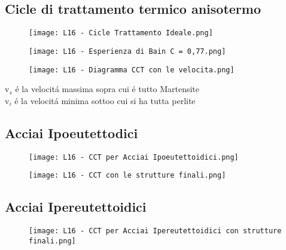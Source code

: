 \documentclass{article}
\begin{document}
{        \subsection{Cicle di trattamento termico anisotermo}
            \begin{figure}[h!]
                \centering
                \texttt{[image: L16 - Cicle Trattamento Ideale.png]}
            \end{figure}
            \begin{figure}[h!]
                \centering
                \texttt{[image: L16 - Esperienza di Bain C = 0,77.png]}
            \end{figure}
            \begin{figure}[h!]
                \centering
                \texttt{[image: L16 - Diagramma CCT con le velocita.png]}
            \end{figure}
            v$_s$ \'e la velocit\'a massima sopra cui \'e tutto Martensite\\
            v$_i$ \'e la velocit\'a minima sottoo cui si ha tutta perlite\\
        \subsection{Acciai Ipoeutettodici}
            \begin{figure}[h!]
                \centering
                \texttt{[image: L16 - CCT per Acciai Ipoeutettoidici.png]}
            \end{figure}
            \begin{figure}[h!]
                \centering
                \texttt{[image: L16 - CCT con le strutture finali.png]}
            \end{figure}
        \subsection{Acciai Ipereutettoidici}
            \begin{figure}[h!]
                \centering
                \texttt{[image: L16 - CCT per Acciai Ipereutettoidici con strutture finali.png]}
            \end{figure}
}
\end{document}
